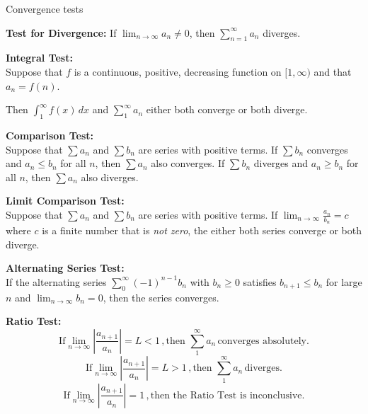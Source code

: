 \documentclass[11pt]{article}
\begin{document}
\begin{center}
\Large
\rm{Convergence tests}
\\


\end{center}

 {\bf Test for Divergence:}  If $\lim_{n\to\infty}a_n \neq 0$, then $\sum_{n=1}^{\infty} a_n $ diverges.\\

 \vspace{0.1in}

 {\bf Integral Test:}  \\
Suppose that $f$ is a continuous, positive, decreasing function on $[1,\infty)$
  and that $a_n = f(n)$.

Then $\int_1^{\infty}f(x)\, dx$  and $\sum_1^{\infty}a_n$ either both converge or both diverge.

\vspace{0.1in}

{\bf Comparison Test:}  \\

Suppose that $\sum a_n$ and $\sum b_n$ are series with positive terms.
If $\sum b_n$ converges and $a_n \leq b_n$ for all $n$, then $\sum a_n$ also converges.
If $\sum b_n$ diverges and $a_n \geq b_n$ for all $n$, then $\sum a_n$ also diverges.


\vspace{0.1in}
{\bf Limit Comparison Test:}  \\

Suppose that $\sum a_n$ and $\sum b_n$ are series with positive terms. If $\lim_{n\to \infty}\frac{a_n}{b_n} = c$
where $c$ is a finite number that is \emph{not zero}, the either both series converge or both diverge.

\vspace{0.1in}

{\bf Alternating Series Test:}  \\

If the alternating series $\sum_0^{\infty}(-1)^{n-1}b_n$ with $b_n\geq 0$
  satisfies $b_{n+1}\leq b_n $ for large $n$ and $\lim_{n\to \infty}b_n = 0$,
  then the series converges.\\

  \vspace{0.1in}

  {\bf Ratio Test:}  \\
  \begin{displaymath}
\mbox{If} \lim_{n\to \infty}\left|\frac{a_{n+1}}{a_n}\right| = L < 1 \,, \mbox{then } \sum_1^{\infty}a_n \, \mbox{converges absolutely.}
  \end{displaymath}
    \begin{displaymath}
\mbox{If} \lim_{n\to \infty}\left|\frac{a_{n+1}}{a_n}\right| = L > 1 \,, \mbox{then } \sum_1^{\infty}a_n \, \mbox{diverges.}
      \end{displaymath}
  \begin{displaymath}
\mbox{If} \lim_{n\to \infty}\left|\frac{a_{n+1}}{a_n}\right| = 1 \,, \mbox{then the Ratio Test is inconclusive.}
      \end{displaymath}
\end{document}
